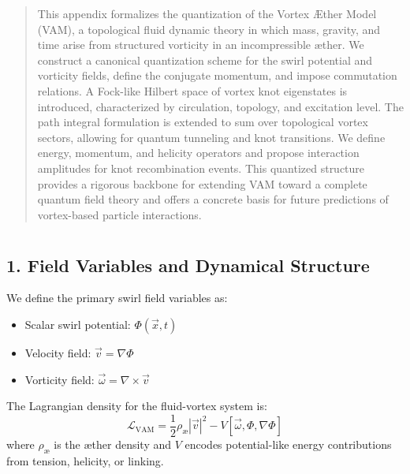 \documentclass[12pt]{article}
\begin{document}
  \titlepageOpen

  \begin{abstract}

This appendix formalizes the quantization of the Vortex Æther Model (VAM), a topological fluid dynamic theory in which mass, gravity, and time arise from structured vorticity in an incompressible æther. We construct a canonical quantization scheme for the swirl potential and vorticity fields, define the conjugate momentum, and impose commutation relations. A Fock-like Hilbert space of vortex knot eigenstates is introduced, characterized by circulation, topology, and excitation level. The path integral formulation is extended to sum over topological vortex sectors, allowing for quantum tunneling and knot transitions. We define energy, momentum, and helicity operators and propose interaction amplitudes for knot recombination events. This quantized structure provides a rigorous backbone for extending VAM toward a complete quantum field theory and offers a concrete basis for future predictions of vortex-based particle interactions.

  \end{abstract}

  \titlepageClose
\fi


\section{\papertitle}

\subsection*{1. Field Variables and Dynamical Structure}

We define the primary swirl field variables as:
\begin{itemize}
    \item Scalar swirl potential: \( \Phi(\vec{x}, t) \)
    \item Velocity field: \( \vec{v} = \nabla \Phi \)
    \item Vorticity field: \( \vec{\omega} = \nabla \times \vec{v} \)
\end{itemize}

The Lagrangian density for the fluid-vortex system is:
\begin{equation}
\mathcal{L}_{\text{VAM}} = \frac{1}{2} \rho_{\text{\ae}} |\vec{v}|^2 - V[\vec{\omega}, \Phi, \nabla \Phi]
\label{eq:Lagrangian}
\end{equation}
where \( \rho_{\text{\ae}} \) is the æther density and \( V \) encodes potential-like energy contributions from tension, helicity, or linking.
\end{document}
